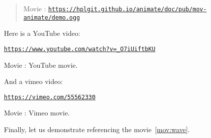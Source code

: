 \documentclass[%
oneside,                 %
final,                   %
10pt]{article}
\newenvironment{doconce:movie}{}{}
\newcounter{doconce:movie:counter}
\begin{document}
\begin{doconce:movie}
\begin{quote}
Movie :  \href{https://hplgit.github.io/animate/doc/pub/mov-animate/demo.ogg}{\nolinkurl{https://hplgit.github.io/animate/doc/pub/mov-animate/demo.ogg}}
\end{quote}
\end{doconce:movie}


Here is a YouTube video:


\begin{doconce:movie}
\begin{center}
\href{{https://www.youtube.com/watch?v=_O7iUiftbKU}}{\nolinkurl{https://www.youtube.com/watch?v=_O7iUiftbKU}}
\end{center}

\begin{center}  %
Movie : YouTube movie.
\end{center}
\end{doconce:movie}


And a vimeo video:


\begin{doconce:movie}
\begin{center}\href{{https://vimeo.com/55562330}}{\nolinkurl{https://vimeo.com/55562330}}\end{center}

\begin{center}  %
Movie : Vimeo movie.
\end{center}
\end{doconce:movie}


Finally, let us demonstrate referencing the movie~\ref{mov:wave}.


\end{document}
